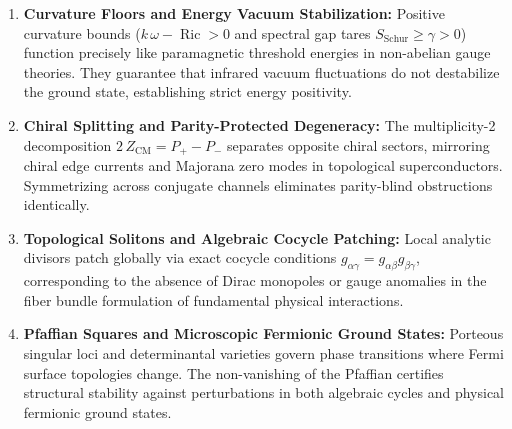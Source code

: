 \documentclass[11pt,a4paper]{article}
\theoremstyle{definition}
\begin{document}
\begin{enumerate}
  \item \textbf{Curvature Floors and Energy Vacuum Stabilization:} 
  Positive curvature bounds ($k\,\omega - \operatorname{Ric} > 0$ and spectral gap tares $S_{\mathrm{Schur}} \ge \gamma > 0$) function precisely like paramagnetic threshold energies in non-abelian gauge theories. They guarantee that infrared vacuum fluctuations do not destabilize the ground state, establishing strict energy positivity.
  
  \item \textbf{Chiral Splitting and Parity-Protected Degeneracy:} 
  The multiplicity-2 decomposition $2\,Z_{\mathrm{CM}} = P_+ - P_-$ separates opposite chiral sectors, mirroring chiral edge currents and Majorana zero modes in topological superconductors. Symmetrizing across conjugate channels eliminates parity-blind obstructions identically.
  
  \item \textbf{Topological Solitons and Algebraic Cocycle Patching:} 
  Local analytic divisors patch globally via exact cocycle conditions $g_{\alpha\gamma} = g_{\alpha\beta} g_{\beta\gamma}$, corresponding to the absence of Dirac monopoles or gauge anomalies in the fiber bundle formulation of fundamental physical interactions.
  
  \item \textbf{Pfaffian Squares and Microscopic Fermionic Ground States:} 
  Porteous singular loci and determinantal varieties govern phase transitions where Fermi surface topologies change. The non-vanishing of the Pfaffian certifies structural stability against perturbations in both algebraic cycles and physical fermionic ground states.
\end{enumerate}
\end{document}
